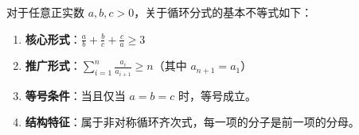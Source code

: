 \begin{statementbox}
对于任意正实数 $a, b, c > 0$，关于循环分式的基本不等式如下：
\begin{enumerate}
    \item \textbf{核心形式}：$\frac{a}{b} + \frac{b}{c} + \frac{c}{a} \geqslant 3$
    \item \textbf{推广形式}：$\sum_{i=1}^{n} \frac{a_i}{a_{i+1}} \geqslant n$（其中 $a_{n+1} = a_1$）
    \item \textbf{等号条件}：当且仅当 $a = b = c$ 时，等号成立。
    \item \textbf{结构特征}：属于非对称循环齐次式，每一项的分子是前一项的分母。
\end{enumerate}
\end{statementbox}